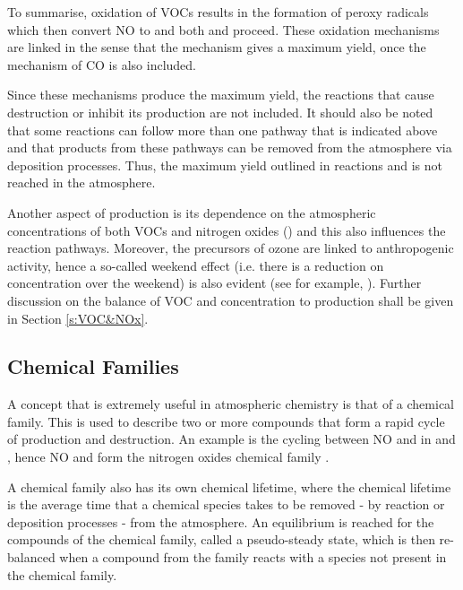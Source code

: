 To summarise, oxidation of VOCs results in the formation of peroxy radicals which then convert NO to  and both 
 and  proceed. These oxidation mechanisms are linked in the sense that the 
 mechanism gives a maximum  yield, once the mechanism of CO is also included. 

Since these mechanisms produce the maximum  yield, the reactions that cause  destruction or inhibit its 
production are not included. It should also be noted that some reactions can follow more than one pathway that is indicated 
above and that products from these pathways can be removed from the atmosphere via deposition processes. Thus, the maximum 
 yield outlined in reactions  and  is not reached in the atmosphere.

Another aspect of  production is its dependence on the atmospheric concentrations of both VOCs and nitrogen oxides 
() and this also influences the reaction pathways. Moreover, the precursors of ozone are linked to 
anthropogenic activity, hence a so-called weekend effect (i.e. there is a reduction on  concentration over the weekend) 
is also evident (see for example, \citep{Koo:2012}). Further discussion on the balance of VOC and  concentration to 
 production shall be given in Section \ref{s:VOC&NOx}.

\subsection{Chemical Families}

A concept that is extremely useful in atmospheric chemistry is that of a chemical family. This is used to describe two or more 
compounds that form a rapid cycle of production and destruction. An example is the cycling between NO and  in 
 and , hence NO and  form the nitrogen oxides chemical family .

A chemical family also has its own chemical lifetime, where the chemical lifetime is the average time that a chemical species 
takes to be removed - by reaction or deposition processes - from the atmosphere. An equilibrium is reached for the compounds of
the chemical family, called a pseudo-steady state, which is then re-balanced when a compound from the family reacts with a 
species not present in the chemical family.

